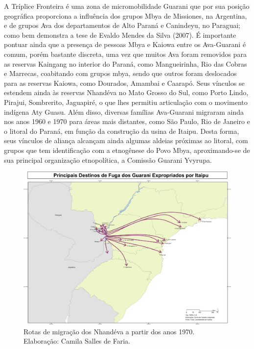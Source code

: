 A Tríplice Fronteira é uma zona de micromobilidade Guarani que por sua
posição geográfica proporciona a influência dos grupos Mbya de
Missiones, na Argentina, e de grupos Ava dos departamentos de Alto
Paraná e Canindeyu, no Paraguai; como bem demonstra a tese de Evaldo
Mendes da Silva (2007).  É importante pontuar ainda que a presença de
pessoas Mbya e Kaiowa entre os Ava-Guarani é comum, porém bastante
discreta, uma vez que muitos Ava foram removidos para as reservas
Kaingang no interior do Paraná, como Mangueirinha, Rio das Cobras e
Marrecas, coabitando com grupos mbya, sendo que outros foram deslocados
para as reservas Kaiowa, como Dourados, Amambai e Caarapó. Seus
vínculos se estendem ainda às reservas Nhandéva no Mato Grosso do Sul,
como Porto Lindo, Pirajui, Sombrerito, Jaguapiré, o que lhes permitiu
articulação com o movimento indígena Aty Guasu. Além disso, diversas
famílias Ava-Guarani migraram ainda nos anos 1960 e 1970 para áreas
mais distantes, como São Paulo, Rio de Janeiro e o litoral do Paraná,
em função da construção da usina de Itaipu. Desta forma, seus vínculos
de aliança alcançam ainda algumas aldeias próximas ao litoral, com
grupos que tem identificação com a etnogênese do Povo Mbya,
aproximando-se de sua principal organização etnopolítica, a Comissão
Guarani Yvyrupa.

 \begin{figure}
  \centering
 \includegraphics[width=\textwidth]{./img/GUARANIS-img8.jpg}	
  \hfill
  \caption{Rotas de migração dos Nhandéva a
partir dos anos 1970. Elaboração: Camila Salles de Faria.}
\end{figure}

